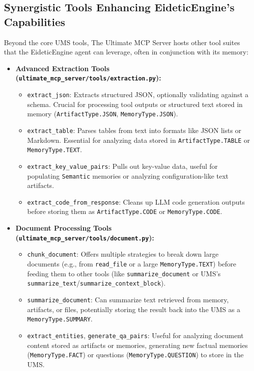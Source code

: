 \documentclass[12pt,a4paper]{article}
\newcommand{\code}[1]{\nolinkurl{#1}}
\begin{document}
\subsection{Synergistic Tools Enhancing EideticEngine's Capabilities}

Beyond the core UMS tools, The Ultimate MCP Server hosts other tool suites that the EideticEngine agent can leverage, often in conjunction with its memory:

\begin{itemize}
    \item \textbf{Advanced Extraction Tools (\code{ultimate\_mcp\_server/tools/extraction.py}):}
    \begin{itemize}
        \item \code{extract\_json}: Extracts structured JSON, optionally validating against a schema. Crucial for processing tool outputs or structured text stored in memory (\code{ArtifactType.JSON}, \code{MemoryType.JSON}).
        \item \code{extract\_table}: Parses tables from text into formats like JSON lists or Markdown. Essential for analyzing data stored in \code{ArtifactType.TABLE} or \code{MemoryType.TEXT}.
        \item \code{extract\_key\_value\_pairs}: Pulls out key-value data, useful for populating \code{Semantic} memories or analyzing configuration-like text artifacts.
        \item \code{extract\_code\_from\_response}: Cleans up LLM code generation outputs before storing them as \code{ArtifactType.CODE} or \code{MemoryType.CODE}.
    \end{itemize}

    \item \textbf{Document Processing Tools (\code{ultimate\_mcp\_server/tools/document.py}):}
    \begin{itemize}
        \item \code{chunk\_document}: Offers multiple strategies to break down large documents (e.g., from \code{read\_file} or a large \code{MemoryType.TEXT}) before feeding them to other tools (like \code{summarize\_document} or UMS's \code{summarize\_text}/\code{summarize\_context\_block}).
        \item \code{summarize\_document}: Can summarize text retrieved from memory, artifacts, or files, potentially storing the result back into the UMS as a \code{MemoryType.SUMMARY}.
        \item \code{extract\_entities}, \code{generate\_qa\_pairs}: Useful for analyzing document content stored as artifacts or memories, generating new factual memories (\code{MemoryType.FACT}) or questions (\code{MemoryType.QUESTION}) to store in the UMS.
    \end{itemize}


\end{itemize}
\end{document}
